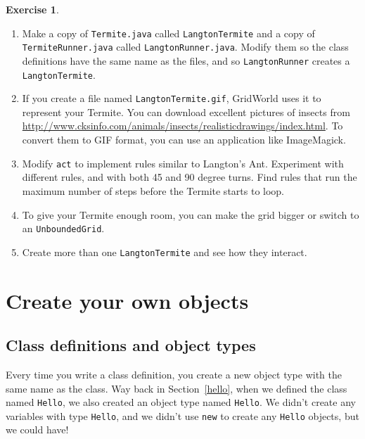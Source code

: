 \documentclass[12pt]{book}
\theoremstyle{definition}
\newtheorem{excz}{Exercise}[chapter]
\newenvironment{exercise}{\bigskip\begin{excz}\mbox{}}{\end{excz}}
\begin{document}
\begin{exercise}

\begin{enumerate}

\item Make a copy of {\tt Termite.java} called {\tt LangtonTermite}
and a copy of {\tt TermiteRunner.java} called {\tt LangtonRunner.java}.
Modify them so the class definitions have the same name as the files,
and so {\tt LangtonRunner} creates a {\tt LangtonTermite}.

\item If you create a file named {\tt LangtonTermite.gif}, GridWorld
  uses it to represent your Termite.  You can download excellent
  pictures of insects from
  \url{http://www.cksinfo.com/animals/insects/realisticdrawings/index.html}.
  To convert them to GIF format, you can use an application like
  ImageMagick.

\item Modify {\tt act} to implement rules similar to Langton's Ant.
Experiment with different rules, and with both 45 and 90 degree turns.
Find rules that run the maximum number of steps before the Termite
starts to loop.

\item To give your Termite enough room, you can make the grid
bigger or switch to an {\tt UnboundedGrid}.

\item Create more than one {\tt LangtonTermite} and see how they
interact.

\end{enumerate}

\end{exercise}


\chapter{Create your own objects}
\label{chap09}

\section{Class definitions and object types}
\label{classes}

Every time you write a class definition, you create a new
object type with the same name as the class.  Way back in
Section~\ref{hello}, when we defined the class named {\tt Hello},
we also created an object type named {\tt Hello}.  We
didn't create any variables with type {\tt Hello}, and we
didn't use {\tt new} to create any {\tt Hello}
objects, but we could have!
\end{document}
